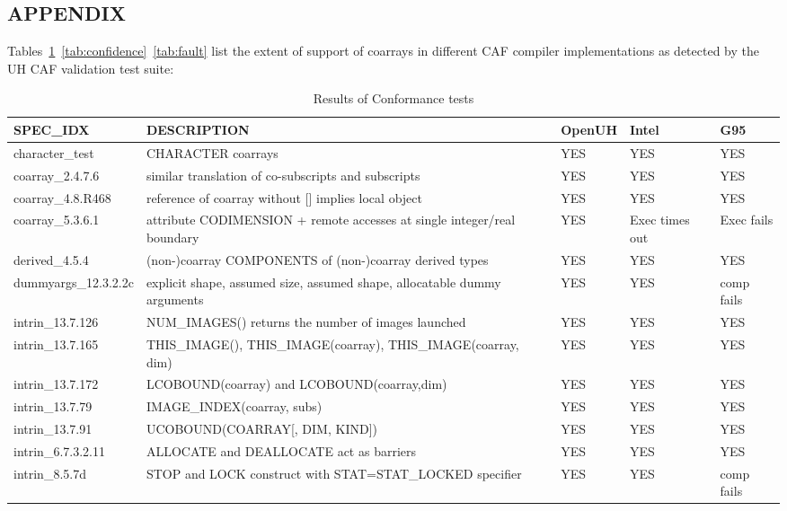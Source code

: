 \subsection{APPENDIX}

Tables~\ref{tab:conformance}~\ref{tab:confidence}~\ref{tab:fault} list the extent of support of coarrays in different CAF compiler implementations as detected by the UH CAF validation test suite:

\begin{table}[tbh!]
\caption{Results of Conformance tests}
\label{tab:conformance}
\begin{tabular}{|l|p{7cm}|p{1.5cm}|p{1.5cm}|p{1.5cm}|}
\hline
SPEC\_IDX              &  DESCRIPTION  & OpenUH & Intel & G95 \\\hline
character\_test        &  CHARACTER coarrays & YES & YES & YES\\\hline
coarray\_2.4.7.6       &  similar translation of co-subscripts and subscripts & YES & YES & YES \\\hline
coarray\_4.8.R468      &  reference of coarray without [] implies local object & YES & YES & YES \\\hline
coarray\_5.3.6.1       &  attribute CODIMENSION + remote accesses at single integer/real boundary & YES & Exec times out & Exec fails\\\hline
derived\_4.5.4         &  (non-)coarray COMPONENTS of (non-)coarray derived types & YES & YES & YES \\\hline
dummyargs\_12.3.2.2c   &  explicit shape, assumed size, assumed shape, allocatable dummy arguments & YES & YES & comp fails\\\hline
intrin\_13.7.126       &  NUM\_IMAGES() returns the number of images launched & YES & YES & YES\\\hline
intrin\_13.7.165       &  THIS\_IMAGE(), THIS\_IMAGE(coarray), THIS\_IMAGE(coarray, dim) & YES & YES & YES\\\hline
intrin\_13.7.172       &  LCOBOUND(coarray) and LCOBOUND(coarray,dim) & YES & YES & YES\\\hline
intrin\_13.7.79        &  IMAGE\_INDEX(coarray, subs) & YES & YES & YES\\\hline
intrin\_13.7.91        &  UCOBOUND(COARRAY[, DIM, KIND]) & YES & YES & YES\\\hline
intrin\_6.7.3.2.11     &  ALLOCATE and DEALLOCATE act as barriers & YES & YES & YES\\\hline
intrin\_8.5.7d         &  STOP and LOCK construct with STAT=STAT\_LOCKED specifier & YES & YES & comp fails\\\hline

\end{tabular}
\end{table}
